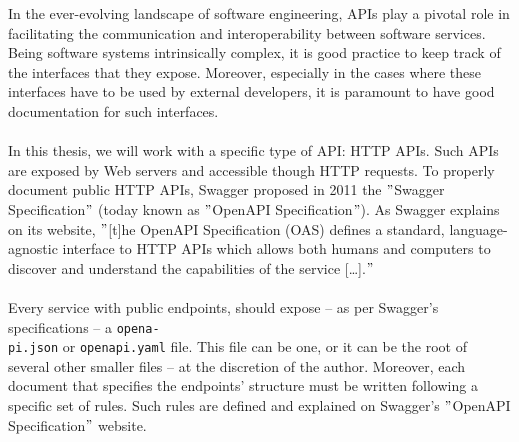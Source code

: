 In the ever-evolving landscape of software engineering, APIs play a pivotal role in facilitating the communication and interoperability between software services.
Being software systems intrinsically complex, it is good practice to keep track of the interfaces that they expose.
Moreover, especially in the cases where these interfaces have to be used by external developers, it is paramount to have good documentation for such interfaces. \\ \\
In this thesis, we will work with a specific type of API: HTTP APIs\@.
Such APIs are exposed by Web servers and accessible though HTTP requests.
To properly document public HTTP APIs, Swagger proposed in 2011 the \("\)Swagger Specification\("\) (today known as \("\)OpenAPI Specification\("\)).
As Swagger explains on its website, \("\)[t]he OpenAPI Specification (OAS) defines a standard, language-agnostic interface to HTTP APIs which allows both humans and computers to discover and understand the capabilities of the service [\dots].\("\)~\cite{swagger_openapi_2021} \\ \\
Every service with public endpoints, should expose -- as per Swagger's specifications -- a \verb|opena-| \\ \verb|pi.json| or \verb|openapi.yaml| file.
This file can be one, or it can be the root of several other smaller files -- at the discretion of the author.
Moreover, each document that specifies the endpoints' structure must be written following a specific set of rules.
Such rules are defined and explained on Swagger's \("\)OpenAPI Specification\("\) website.
